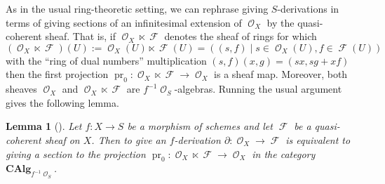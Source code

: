 \documentclass{amsart}
\newtheorem{lemma}[equation]{Lemma}
\theoremstyle{definition}
\DeclareMathOperator{\Fscr}{\mathscr{F}}
\DeclareMathOperator{\Ocal}{\mathcal{O}}
\newcommand{\CAlg}[1]{\mathbf{CAlg}_{#1}}
\DeclareMathOperator{\pr}{pr}
\numberwithin{equation}{subsection}
\begin{document}
As in the usual ring-theoretic setting, we can rephrase giving $S$-derivations in terms of giving sections of an infinitesimal extension of $\Ocal_X$ by the quasi-coherent sheaf. That is, if $\Ocal_X\ltimes \Fscr$ denotes the sheaf of rings for which
\[
\left(\Ocal_X\ltimes \Fscr\right)(U) := \Ocal_X(U) \ltimes \Fscr(U) = \left((s,f) \; | \; s \in \Ocal_X(U), f \in \Fscr(U)\right)
\]
with the ``ring of dual numbers'' multiplication $(s,f)(x,g) = (sx, sg + xf)$ then the first projection $\pr_0:\Ocal_X \ltimes \Fscr \to \Ocal_X$ is a sheaf map. Moreover, both sheaves $\Ocal_X$ and $\Ocal_X\ltimes \Fscr$ are $f^{-1}\Ocal_S$-algebras. Running the usual argument  gives the following lemma.

\begin{lemma}[{\cite[Section 16.5.1]{EGA44}}]\label{Lemma: Section Background Scheme: S derivations and sections}
Let $f:X \to S$ be a morphism of schemes and let $\Fscr$ be a quasi-coherent sheaf on $X$. Then to give an $f$-derivation $\partial:\Ocal_X \to \Fscr$ is equivalent to giving a section to the projection $\pr_0:\Ocal_X \ltimes \Fscr \to \Ocal_X$ in the category $\CAlg{f^{-1}\Ocal_S}$.
\end{lemma}
\end{document}
